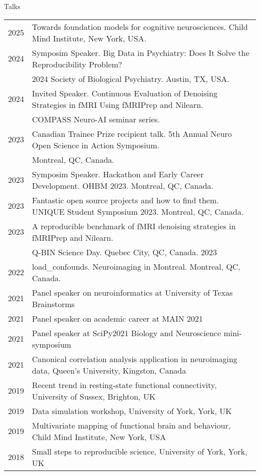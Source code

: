 \documentclass{resume} %
\begin{document}
\begin{rSection}{Talks}
  \begin{tabular}{@{} l l @{\hspace{10ex}}}
 	2025 & Towards foundation models for cognitive neurosciences. Child Mind Institute, New York, USA. \\
    2024 & Symposim Speaker. Big Data in Psychiatry: Does It Solve the Reproducibility Problem? \\ & 2024 Society of Biological Psychiatry. Austin, TX, USA.\\
    2024 & Invited Speaker. Continuous Evaluation of Denoising Strategies in fMRI Using fMRIPrep and Nilearn. \\ & COMPASS Neuro-AI seminar series.\\
    2023 & Canadian Trainee Prize recipient talk. 5th Annual Neuro Open Science in Action Symposium. \\ & Montreal, QC, Canada.\\
    2023 & Symposim Speaker. Hackathon and Early Career Development. OHBM 2023. Montreal, QC, Canada.\\
    2023 & Fantastic open source projects and how to find them. UNIQUE Student Symposium 2023. Montreal, QC, Canada.\\
    2023 & A reproducible benchmark of fMRI denoising strategies in fMRIPrep and Nilearn. \\ & Q-BIN Science Day. Quebec City, QC, Canada. 2023\\
   	2022 & load\_confounds. Neuroimaging in Montreal. Montreal, QC, Canada.\\
    2021 & Panel speaker on neuroinformatics at University of Texas Brainstorms\\
    2021 & Panel speaker on academic career at MAIN 2021\\
    2021 & Panel speaker at SciPy2021 Biology and Neuroscience mini-symposium\\
  	2021 & Canonical correlation analysis application in neuroimaging data, Queen's University, Kingston, Canada\\
    2019 & Recent trend in resting-state functional connectivity, University of Sussex, Brighton, UK\\
    2019 & Data simulation workshop, University of York, York, UK\\
    2019 & Multivariate mapping of functional brain and behaviour, Child Mind Institute, New York, USA\\
    2018 & Small steps to reproducible science, University of York, York, UK\\
  \end{tabular}
\end{rSection}
\end{document}
